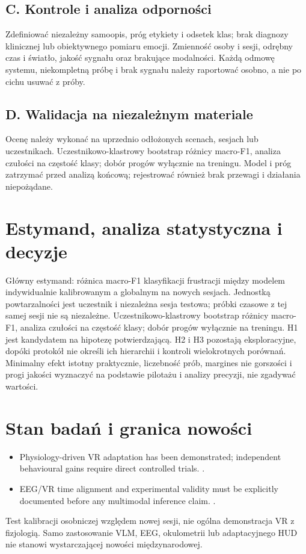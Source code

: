 \documentclass[11pt,a4paper]{article}
\begin{document}
\subsection{C. Kontrole i analiza odporności}
Zdefiniować niezależny samoopis, próg etykiety i odsetek klas; brak diagnozy klinicznej lub obiektywnego pomiaru emocji. Zmienność osoby i sesji, odrębny czas i światło, jakość sygnału oraz brakujące modalności. Każdą odmowę systemu, niekompletną próbę i brak sygnału należy raportować osobno, a nie po cichu usuwać z próby.

\subsection{D. Walidacja na niezależnym materiale}
Ocenę należy wykonać na uprzednio odłożonych scenach, sesjach lub uczestnikach. Uczestnikowo-klastrowy bootstrap różnicy macro-F1, analiza czułości na częstość klasy; dobór progów wyłącznie na treningu. Model i próg zatrzymać przed analizą końcową; rejestrować również brak przewagi i działania niepożądane.

\section{Estymand, analiza statystyczna i decyzje}
Główny estymand: różnica macro-F1 klasyfikacji frustracji między modelem indywidualnie kalibrowanym a globalnym na nowych sesjach. Jednostką powtarzalności jest uczestnik i niezależna sesja testowa; próbki czasowe z tej samej sesji nie są niezależne. Uczestnikowo-klastrowy bootstrap różnicy macro-F1, analiza czułości na częstość klasy; dobór progów wyłącznie na treningu. H1 jest kandydatem na hipotezę potwierdzającą. H2 i H3 pozostają eksploracyjne, dopóki protokół nie określi ich hierarchii i kontroli wielokrotnych porównań. Minimalny efekt istotny praktycznie, liczebność prób, margines nie gorszości i progi jakości wyznaczyć na podstawie pilotażu i analizy precyzji, nie zgadywać wartości.

\section{Stan badań i granica nowości}
\begin{itemize}
\item Physiology-driven VR adaptation has been demonstrated; independent behavioural gains require direct controlled trials. \cite{xrprior1}.
\item EEG/VR time alignment and experimental validity must be explicitly documented before any multimodal inference claim. \cite{xrprior2}.
\end{itemize}
Test kalibracji osobniczej względem nowej sesji, nie ogólna demonstracja VR z fizjologią. Samo zastosowanie VLM, EEG, okulometrii lub adaptacyjnego HUD nie stanowi wystarczającej nowości międzynarodowej.
\end{document}
